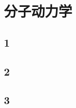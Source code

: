 \documentclass[10pt]{ctexrep}
\begin{document}
\chapter[MD]{分子动力学}
\section{1}
\section{2}
\section{3}
\end{document}
